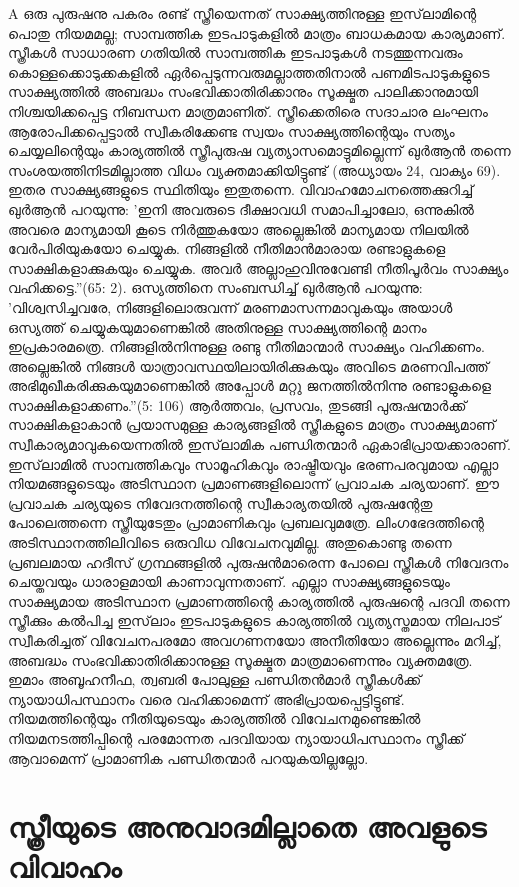 A ഒരു പുരുഷനു പകരം രണ്ട് സ്ത്രീയെന്നത് സാക്ഷ്യത്തിനുള്ള ഇസ്‌ലാമിന്റെ പൊതു നിയമമല്ല; സാമ്പത്തിക ഇടപാടുകളില്‍ മാത്രം ബാധകമായ കാര്യമാണ്. സ്ത്രീകള്‍ സാധാരണ ഗതിയില്‍ സാമ്പത്തിക ഇടപാടുകള്‍ നടത്തുന്നവരും കൊള്ളക്കൊടുക്കകളില്‍ ഏര്‍പ്പെടുന്നവരുമല്ലാത്തതിനാല്‍ പണമിടപാടുകളുടെ സാക്ഷ്യത്തില്‍ അബദ്ധം സംഭവിക്കാതിരിക്കാനും സൂക്ഷ്മത പാലിക്കാനുമായി നിശ്ചയിക്കപ്പെട്ട നിബന്ധന മാത്രമാണിത്. സ്ത്രീക്കെതിരെ സദാചാര ലംഘനം ആരോപിക്കപ്പെട്ടാല്‍ സ്വീകരിക്കേണ്ട സ്വയം സാക്ഷ്യത്തിന്റെയും സത്യം ചെയ്യലിന്റെയും കാര്യത്തില്‍ സ്ത്രീപുരുഷ വ്യത്യാസമൊട്ടുമില്ലെന്ന് ഖുര്‍ആന്‍ തന്നെ സംശയത്തിനിടമില്ലാത്ത വിധം വ്യക്തമാക്കിയിട്ടുണ്ട് (അധ്യായം 24, വാക്യം 69).
ഇതര സാക്ഷ്യങ്ങളുടെ സ്ഥിതിയും ഇതുതന്നെ. വിവാഹമോചനത്തെക്കുറിച്ച് ഖുര്‍ആന്‍ പറയുന്നു: 'ഇനി അവരുടെ ദീക്ഷാവധി സമാപിച്ചാലോ, ഒന്നുകില്‍ അവരെ മാന്യമായി കൂടെ നിര്‍ത്തുകയോ അല്ലെങ്കില്‍ മാന്യമായ നിലയില്‍ വേര്‍പിരിയുകയോ ചെയ്യുക. നിങ്ങളില്‍ നീതിമാന്‍മാരായ രണ്ടാളുകളെ സാക്ഷികളാക്കുകയും ചെയ്യുക. അവര്‍ അല്ലാഹുവിനുവേണ്ടി നീതിപൂര്‍വം സാക്ഷ്യം വഹിക്കട്ടെ.''(65: 2). ഒസ്യത്തിനെ സംബന്ധിച്ച് ഖുര്‍ആന്‍ പറയുന്നു: 'വിശ്വസിച്ചവരേ, നിങ്ങളിലൊരുവന്ന് മരണമാസന്നമാവുകയും അയാള്‍ ഒസ്യത്ത് ചെയ്യുകയുമാണെങ്കില്‍ അതിനുള്ള സാക്ഷ്യത്തിന്റെ മാനം ഇപ്രകാരമത്രെ. നിങ്ങളില്‍നിന്നുള്ള രണ്ടു നീതിമാന്മാര്‍ സാക്ഷ്യം വഹിക്കണം. അല്ലെങ്കില്‍ നിങ്ങള്‍ യാത്രാവസ്ഥയിലായിരിക്കുകയും അവിടെ മരണവിപത്ത് അഭിമുഖീകരിക്കുകയുമാണെങ്കില്‍ അപ്പോള്‍ മറ്റു ജനത്തില്‍നിന്നു രണ്ടാളുകളെ സാക്ഷികളാക്കണം.''(5: 106)
ആര്‍ത്തവം, പ്രസവം, തുടങ്ങി പുരുഷന്മാര്‍ക്ക് സാക്ഷികളാകാന്‍ പ്രയാസമുള്ള കാര്യങ്ങളില്‍ സ്ത്രീകളുടെ മാത്രം സാക്ഷ്യമാണ് സ്വീകാര്യമാവുകയെന്നതില്‍ ഇസ്‌ലാമിക പണ്ഡിതന്മാര്‍ ഏകാഭിപ്രായക്കാരാണ്.
ഇസ്‌ലാമില്‍ സാമ്പത്തികവും സാമൂഹികവും രാഷ്ട്രീയവും ഭരണപരവുമായ എല്ലാ നിയമങ്ങളുടെയും അടിസ്ഥാന പ്രമാണങ്ങളിലൊന്ന് പ്രവാചക ചര്യയാണ്. ഈ പ്രവാചക ചര്യയുടെ നിവേദനത്തിന്റെ സ്വീകാര്യതയില്‍ പുരുഷന്റേതു പോലെത്തന്നെ സ്ത്രീയുടേതും പ്രാമാണികവും പ്രബലവുമത്രേ. ലിംഗഭേദത്തിന്റെ അടിസ്ഥാനത്തിലിവിടെ ഒരുവിധ വിവേചനവുമില്ല. അതുകൊണ്ടു തന്നെ പ്രബലമായ ഹദീസ് ഗ്രന്ഥങ്ങളില്‍ പുരുഷന്‍മാരെന്ന പോലെ സ്ത്രീകള്‍ നിവേദനം ചെയ്തവയും ധാരാളമായി കാണാവുന്നതാണ്. എല്ലാ സാക്ഷ്യങ്ങളുടെയും സാക്ഷ്യമായ അടിസ്ഥാന പ്രമാണത്തിന്റെ കാര്യത്തില്‍ പുരുഷന്റെ പദവി തന്നെ സ്ത്രീക്കും കല്‍പിച്ച ഇസ്‌ലാം ഇടപാടുകളുടെ കാര്യത്തില്‍ വ്യത്യസ്തമായ നിലപാട് സ്വീകരിച്ചത് വിവേചനപരമോ അവഗണനയോ അനീതിയോ അല്ലെന്നും മറിച്ച്, അബദ്ധം സംഭവിക്കാതിരിക്കാനുള്ള സൂക്ഷ്മത മാത്രമാണെന്നും വ്യക്തമത്രേ.
ഇമാം അബൂഹനീഫ, ത്വബരി പോലുള്ള പണ്ഡിതന്‍മാര്‍ സ്ത്രീകള്‍ക്ക് ന്യായാധിപസ്ഥാനം വരെ വഹിക്കാമെന്ന് അഭിപ്രായപ്പെട്ടിട്ടുണ്ട്. നിയമത്തിന്റെയും നീതിയുടെയും കാര്യത്തില്‍ വിവേചനമുണ്ടെങ്കില്‍ നിയമനടത്തിപ്പിന്റെ പരമോന്നത പദവിയായ ന്യായാധിപസ്ഥാനം സ്ത്രീക്ക് ആവാമെന്ന് പ്രാമാണിക പണ്ഡിതന്മാര്‍ പറയുകയില്ലല്ലോ.
\chapter{സ്ത്രീയുടെ അനുവാദമില്ലാതെ അവളുടെ വിവാഹം }
